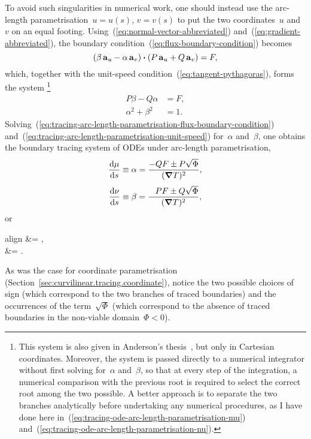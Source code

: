 To avoid such singularities in numerical work, one should instead use
the arc-length parametrisation~$u = u (s)$, $v = v(s)$
to put the two coordinates~$u$ and~$v$ on an equal footing.
Using~(\ref{eq:normal-vector-abbreviated})
and~(\ref{eq:gradient-abbreviated}),
the boundary condition~(\ref{eq:flux-boundary-condition}) becomes
\[
  \roundbr[\bulkysize]{\beta \basisvec{u} - \alpha \basisvec{v}}
    \dotp
  \roundbr[\bulkysize]{P \basisvec{u} + Q \basisvec{v}}
    =
  F,
\]
which, together with the unit-speed condition~(\ref{eq:tangent-pythagoras}),
forms the system%
\footnote{
  This system is also given
  in Anderson's thesis~\cite{anderson-2002-thesis-boundary-tracing-pdes},
  but only in Cartesian coordinates.
  Moreover, the system is passed directly to a numerical integrator
  without first solving for~$\alpha$ and~$\beta$,
  so that at every step of the integration,
  a numerical comparison with the previous root
  is required to select the correct root among the two possible.
  A better approach is to separate the two branches analytically
  before undertaking any numerical procedures,
  as I have done here
  in~(\ref{eq:tracing-ode-arc-length-parametrisation-mu})
  and~(\ref{eq:tracing-ode-arc-length-parametrisation-nu}).
}
\begin{align}
  P \beta - Q \alpha &= F,
    \label{eq:tracing-arc-length-parametrisation-flux-boundary-condition} \\
  \alpha^2 + \beta^2 &= 1.
    \label{eq:tracing-arc-length-parametrisation-unit-speed}
\end{align}
Solving~(\ref{eq:tracing-arc-length-parametrisation-flux-boundary-condition})
and~(\ref{eq:tracing-arc-length-parametrisation-unit-speed})
for~$\alpha$ and~$\beta$, one obtains
the boundary tracing system of ODEs under arc-length parametrisation,
\begin{align}
  \tder{\mu}{s} &\ideq \alpha = \frac{-Q F \pm P \sqrt{\Phi}}{(\del T)^2},
    \label{eq:tracing-ode-arc-length-parametrisation-mu} \\[\tallspace]
  \tder{\nu}{s} &\ideq \beta = \frac{\+P F \pm Q \sqrt{\Phi}}{(\del T)^2},
    \label{eq:tracing-ode-arc-length-parametrisation-nu}
\end{align}
or
\begin{important}{align}
   &= ,
    \label{eq:tracing-ode-arc-length-parametrisation-u} \\[\tallspace]
   &= .
    \label{eq:tracing-ode-arc-length-parametrisation-v}
\end{important}
As was the case for coordinate parametrisation
(Section~\ref{sec:curvilinear.tracing.coordinate}),
notice the two possible choices of sign
(which correspond to the two branches of traced boundaries)
and the occurrences of the term~$\sqrt{\Phi}$
(which correspond to the absence of traced boundaries
in the non-viable domain~$\Phi < 0$).


